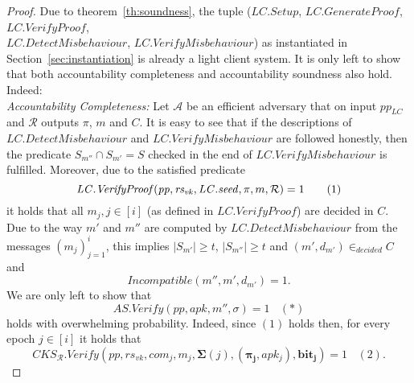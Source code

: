 \begin{proof}
\noindent Due to theorem~\ref{th:soundness}, the tuple 
($\mathit{LC.Setup}$, $\mathit{LC.GenerateProof}$, $\mathit{LC.VerifyProof}$, \\ $\mathit{LC.DetectMisbehaviour}$, 
$\mathit{LC.VerifyMisbehaviour}$) as instantiated in Section~\ref{sec:instantiation} is already a light client system. 
It is only left to show that both accountability completeness and accountability soundness also hold. Indeed: \\

\noindent \textit{Accountability Completeness:} %
Let $\mathcal{A}$ be an efficient adversary that on input $\mathit{pp_{\mathit{LC}}}$ and $\mathcal{R}$ outputs 
 $\pi$, $m$ and $C$. It is easy to see that if the descriptions of $\mathit{LC.DetectMisbehaviour}$ and $\mathit{LC.VerifyMisbehaviour}$ are followed honestly,  
then the predicate $S_{m''} \cap S_{m'} = S$ checked in the end of $\mathit{LC.VerifyMisbehaviour}$ is fulfilled. Moreover, due to the satisfied predicate
$$\mathit{LC.VerifyProof}(\mathit{pp}, \mathit{rs_{\mathit{vk}}}, \LCseed, \pi, m, \mathcal{R}) = 1 \ \ \ \ \ \ (1)$$ %
it holds that all $m_j, j \in [i]$ (as defined in $\mathit{LC.VerifyProof}$) are decided in $C$. Due to the way $m'$ and $m''$ are computed 
by $\mathit{LC.DetectMisbehaviour}$ from the messages $(m_j)_{j=1}^i$, this implies $|S_{m'}| \geq t$, $|S_{m''}| \geq t$ and $(\mathit{m'}, d_{\mathit{m'}}) \in_{\mathit{decided}} C$ and 
 $$\mathit{Incompatible(m'', m', d_{m'})} = 1.$$ We are only left to show that 
 $$\mathit{AS.Verify}(\mathit{pp}, \mathit{apk}, m'', \sigma) =1 \ \ \ \ (*)$$ 
\noindent holds with overwhelming probability. Indeed, since $(1)$ holds then, for every epoch $j \in [i]$ it holds that 
$$\mathit{CKS_{\mathcal{R}}.Verify}(\mathit{pp},  \mathit{rs_{\mathit{vk}}}, \mathit{com_j}, m_j,  \mathbf{\Sigma}(j), (\mathbf{\pi_{j}},\mathit{apk_j}), 
\mathbf{bit_j}) = 1 \ \ \ \ (2).$$

\end{proof}
